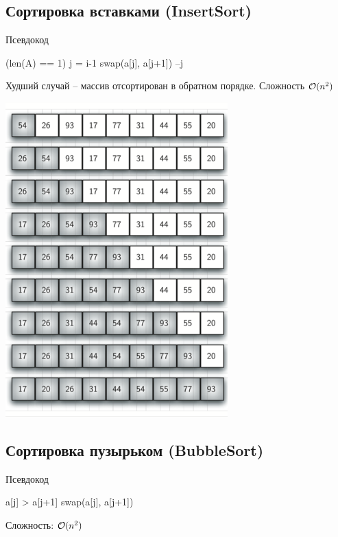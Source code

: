 \begin{multicols}{2}
    \subsection*{Сортировка вставками (InsertSort)}
    Псевдокод 
    \begin{algorithmic}[1]
        \If (len(A) == 1)
        \State \Return
        \EndIf
        \State j = i-1
        \State swap(a[j], a[j+1])
        \State --j
        \EndWhile
        \EndFor
        \EndFunction
    \end{algorithmic}
    Худший случай -- массив отсортирован в обратном порядке. Сложность ${\cal O}(n^2)$
    \begin{center}
        \includegraphics[scale=1.2]{images/insertsort.png}
    \end{center}
    \subsection*{Сортировка пузырьком (BubbleSort)}
    Псевдокод
    \begin{algorithmic}[1]
        \If a[j] > a[j+1]
        \State swap(a[j], a[j+1])
        \EndIf
        \EndFor
        \EndFor
        \EndFunction
    \end{algorithmic}
    Сложность: ${\cal O}(n^2)$

\end{multicols}
